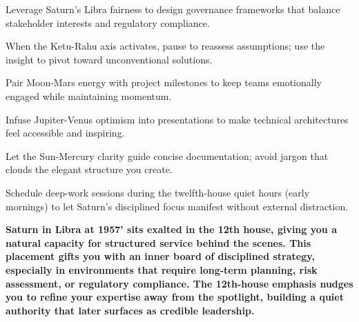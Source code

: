\begin{diamondlist}
  \item {\fontsize{8.5}{12}\selectfont Leverage Saturn's Libra fairness to design governance frameworks that balance stakeholder interests and regulatory compliance.}
  \item {\fontsize{8.5}{12}\selectfont When the Ketu-Rahu axis activates, pause to reassess assumptions; use the insight to pivot toward unconventional solutions.}
  \item {\fontsize{8.5}{12}\selectfont Pair Moon-Mars energy with project milestones to keep teams emotionally engaged while maintaining momentum.}
  \item {\fontsize{8.5}{12}\selectfont Infuse Jupiter-Venus optimism into presentations to make technical architectures feel accessible and inspiring.}
  \item {\fontsize{8.5}{12}\selectfont Let the Sun-Mercury clarity guide concise documentation; avoid jargon that clouds the elegant structure you create.}
  \item {\fontsize{8.5}{12}\selectfont Schedule deep-work sessions during the twelfth-house quiet hours (early mornings) to let Saturn's disciplined focus manifest without external distraction.}
\end{diamondlist}


\label{topic36}

{\fontsize{9.5}{13.8}\selectfont\bfseries\color{DeepSlate} Saturn in Libra at 19\textdegree{}57' sits exalted in the 12th house, giving you a natural capacity for structured service behind the scenes. This placement gifts you with an inner board of disciplined strategy, especially in environments that require long-term planning, risk assessment, or regulatory compliance. The 12th-house emphasis nudges you to refine your expertise away from the spotlight, building a quiet authority that later surfaces as credible leadership.}\par\vspace{2mm}

